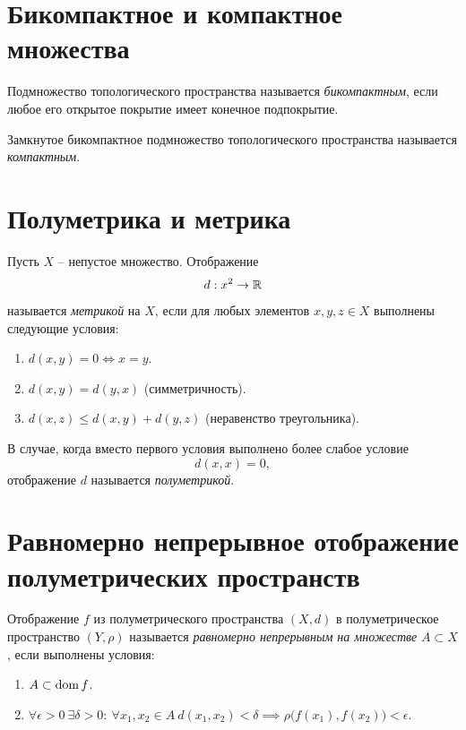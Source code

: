 \section{Бикомпактное и компактное множества}

\begin{definition}
  Подмножество топологического пространства называется \emph{бикомпактным}, если любое его открытое покрытие имеет конечное подпокрытие.
\end{definition}

\begin{definition}
 Замкнутое бикомпактное подмножество топологического пространства называется \emph{компактным}. 
\end{definition}

\newpage

\section{Полуметрика и метрика}

\begin{definition}
  Пусть $X$ -- непустое множество. Отображение
  \[
    d : x^2 \rightarrow \mathbb{R}
  \]
  называется \emph{метрикой} на $X$, если для любых элементов $x,y,z \in X$ выполнены следующие условия:
  \begin{enumerate}
    \item $d(x,y) = 0 \iff x = y$.
      \item $d(x,y) = d(y,x)$ (симметричность).
        \item $d(x,z) \leqslant d(x,y) + d(y,z)$ (неравенство треугольника).
  \end{enumerate}
  
  В случае, когда вместо первого условия выполнено более слабое условие
  \[
    d(x,x) = 0,
  \]
  отображение $d$ называется \emph{полуметрикой}.
\end{definition}

\section{Равномерно непрерывное отображение полуметрических пространств}

\begin{definition}
  Отображение $f$ из полуметрического пространства $(X,d)$ в полуметрическое пространство $(Y,\rho)$ называется \emph{равномерно непрерывным на множестве} $A \subset X$, если выполнены условия:
  \begin{enumerate}
    \item $A \subset \operatorname{dom} f$.
      \item $\forall \epsilon > 0 \ \exists \delta > 0 : \ \forall x_1,x_2 \in A \ d(x_1,x_2) < \delta \implies \rho \big(f(x_1),f(x_2)\big) < \epsilon $.
  \end{enumerate}
\end{definition}

